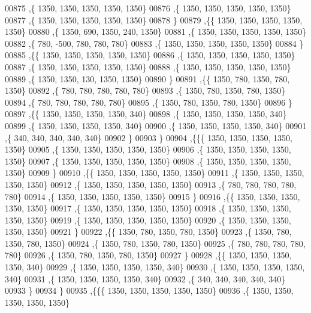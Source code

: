 \begin{DoxyCode}
00875    ,\{  1350,  1350,  1350,  1350,  1350\}
00876    ,\{  1350,  1350,  1350,  1350,  1350\}
00877    ,\{  1350,  1350,  1350,  1350,  1350\}
00878    \}
00879   ,\{\{  1350,  1350,  1350,  1350,  1350\}
00880    ,\{  1350,   690,  1350,   240,  1350\}
00881    ,\{  1350,  1350,  1350,  1350,  1350\}
00882    ,\{   780,  -500,   780,   780,   780\}
00883    ,\{  1350,  1350,  1350,  1350,  1350\}
00884    \}
00885   ,\{\{  1350,  1350,  1350,  1350,  1350\}
00886    ,\{  1350,  1350,  1350,  1350,  1350\}
00887    ,\{  1350,  1350,  1350,  1350,  1350\}
00888    ,\{  1350,  1350,  1350,  1350,  1350\}
00889    ,\{  1350,  1350,   130,  1350,  1350\}
00890    \}
00891   ,\{\{  1350,   780,  1350,   780,  1350\}
00892    ,\{   780,   780,   780,   780,   780\}
00893    ,\{  1350,   780,  1350,   780,  1350\}
00894    ,\{   780,   780,   780,   780,   780\}
00895    ,\{  1350,   780,  1350,   780,  1350\}
00896    \}
00897   ,\{\{  1350,  1350,  1350,  1350,   340\}
00898    ,\{  1350,  1350,  1350,  1350,   340\}
00899    ,\{  1350,  1350,  1350,  1350,   340\}
00900    ,\{  1350,  1350,  1350,  1350,   340\}
00901    ,\{   340,   340,   340,   340,   340\}
00902    \}
00903   \}
00904  ,\{\{\{  1350,  1350,  1350,  1350,  1350\}
00905    ,\{  1350,  1350,  1350,  1350,  1350\}
00906    ,\{  1350,  1350,  1350,  1350,  1350\}
00907    ,\{  1350,  1350,  1350,  1350,  1350\}
00908    ,\{  1350,  1350,  1350,  1350,  1350\}
00909    \}
00910   ,\{\{  1350,  1350,  1350,  1350,  1350\}
00911    ,\{  1350,  1350,  1350,  1350,  1350\}
00912    ,\{  1350,  1350,  1350,  1350,  1350\}
00913    ,\{   780,   780,   780,   780,   780\}
00914    ,\{  1350,  1350,  1350,  1350,  1350\}
00915    \}
00916   ,\{\{  1350,  1350,  1350,  1350,  1350\}
00917    ,\{  1350,  1350,  1350,  1350,  1350\}
00918    ,\{  1350,  1350,  1350,  1350,  1350\}
00919    ,\{  1350,  1350,  1350,  1350,  1350\}
00920    ,\{  1350,  1350,  1350,  1350,  1350\}
00921    \}
00922   ,\{\{  1350,   780,  1350,   780,  1350\}
00923    ,\{  1350,   780,  1350,   780,  1350\}
00924    ,\{  1350,   780,  1350,   780,  1350\}
00925    ,\{   780,   780,   780,   780,   780\}
00926    ,\{  1350,   780,  1350,   780,  1350\}
00927    \}
00928   ,\{\{  1350,  1350,  1350,  1350,   340\}
00929    ,\{  1350,  1350,  1350,  1350,   340\}
00930    ,\{  1350,  1350,  1350,  1350,   340\}
00931    ,\{  1350,  1350,  1350,  1350,   340\}
00932    ,\{   340,   340,   340,   340,   340\}
00933    \}
00934   \}
00935  ,\{\{\{  1350,  1350,  1350,  1350,  1350\}
00936    ,\{  1350,  1350,  1350,  1350,  1350\}

\end{DoxyCode}
